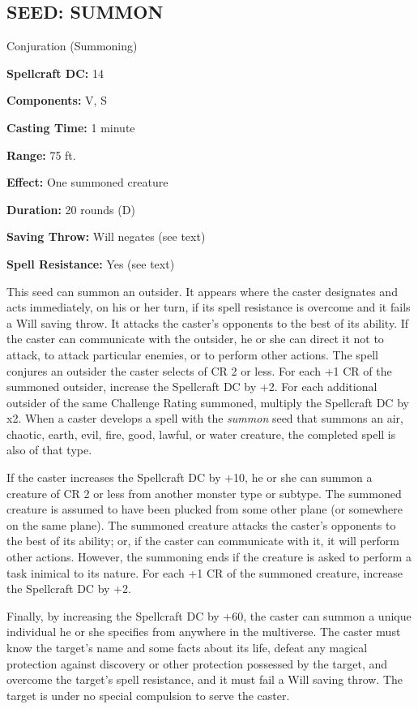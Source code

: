 \documentclass{article}
\begin{document}
\vspace{12pt}
\subsection*{SEED: SUMMON }

Conjuration (Summoning) 

\textbf{Spellcraft DC:} 14 

\textbf{Components:} V, S 

\textbf{Casting Time:} 1 minute 

\textbf{Range:} 75 ft. 

\textbf{Effect:} One summoned creature 

\textbf{Duration:} 20 rounds (D) 

\textbf{Saving Throw:} Will negates (see text) 

\textbf{Spell Resistance:} Yes (see text) 

This seed can summon an outsider. It appears where the caster designates and acts 
immediately, on his or her turn, if its spell resistance is overcome and it fails 
a Will saving throw. It attacks the caster's opponents to the best of its ability. 
If the caster can communicate with the outsider, he or she can direct it not to 
attack, to attack particular enemies, or to perform other actions. The spell conjures 
an outsider the caster selects of CR 2 or less. For each +1 CR of the summoned 
outsider, increase the Spellcraft DC by +2. For each additional outsider of the 
same Challenge Rating summoned, multiply the Spellcraft DC by x2. When a caster 
develops a spell with the \textit{summon }seed that summons an air, chaotic, earth, 
evil, fire, good, lawful, or water creature, the completed spell is also of that 
type. 

If the caster increases the Spellcraft DC by +10, he or she can summon a creature 
of CR 2 or less from another monster type or subtype. The summoned creature is 
assumed to have been plucked from some other plane (or somewhere on the same plane). 
The summoned creature attacks the caster's opponents to the best of its ability; 
or, if the caster can communicate with it, it will perform other actions. However, 
the summoning ends if the creature is asked to perform a task inimical to its nature. 
For each +1 CR of the summoned creature, increase the Spellcraft DC by +2. 

Finally, by increasing the Spellcraft DC by +60, the caster can summon a unique 
individual he or she specifies from anywhere in the multiverse. The caster must 
know the target's name and some facts about its life, defeat any magical protection 
against discovery or other protection possessed by the target, and overcome the 
target's spell resistance, and it must fail a Will saving throw. The target is 
under no special compulsion to serve the caster. 
\end{document}
